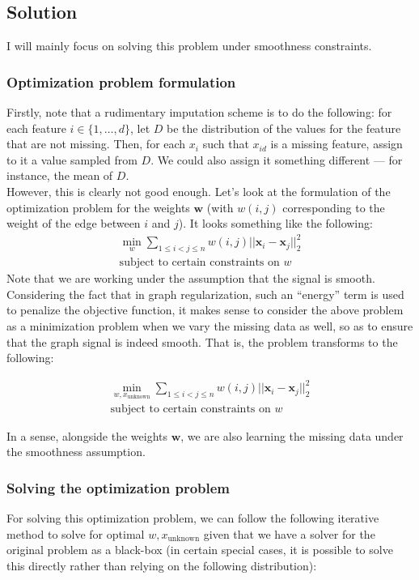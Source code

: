 \documentclass[a4paper]{article}
\newcommand{\nl}{\vspace{0.2cm}\\}
\newcommand{\mf}{\mathbf}
\begin{document}
\subsection{Solution}
I will mainly focus on solving this problem under smoothness constraints.

\subsubsection{Optimization problem formulation}
Firstly, note that a rudimentary imputation scheme is to do the following: for each feature $i \in \{1, \ldots, d\}$, let $D$ be the distribution of the values for the feature that are not
missing. Then, for each $x_i$ such that $x_{id}$ is a missing feature, assign to it a value sampled from $D$. We could also assign it something different --- for instance, the mean of $D$.\nl
However, this is clearly not good enough. Let's look at the formulation of the optimization problem for the weights $\mf{w}$ (with $w(i, j)$ corresponding to the weight of the edge between
$i$ and $j$). It looks something like the following:\\
\begin{align*}
    \min_{w} \sum_{1 \le i < j \le n} w(i, j) ||\mf{x}_i - \mf{x}_j||_2^2\\
    \text{subject to certain constraints on }w
\end{align*}
Note that we are working under the assumption that the signal is smooth. Considering the fact that in graph regularization, such an ``energy'' term is used to penalize the objective function, it
makes sense to consider the above problem as a minimization problem when we vary the missing data as well, so as to ensure that the graph signal is indeed smooth. That is, the problem transforms to the following:

\begin{align*}
    \min_{w, x_{\text{unknown}}} \sum_{1 \le i < j \le n} w(i, j) ||\mf{x}_i - \mf{x}_j||_2^2\\
    \text{subject to certain constraints on }w
\end{align*}

In a sense, alongside the weights $\mf{w}$, we are also learning the missing data under the smoothness assumption.

\subsubsection{Solving the optimization problem}
For solving this optimization problem, we can follow the following iterative method to solve for optimal $w, x_{\text{unknown}}$ given that we have a solver for the original problem as a
black-box (in certain special cases, it is possible to solve this directly rather than relying on the following distribution):
\end{document}
